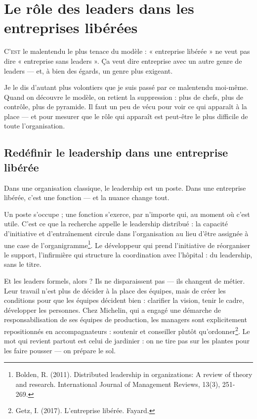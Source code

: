 
\chapter{Le rôle des leaders dans les entreprises libérées}

\lettrine[lines=2]{C}{'est} le malentendu le plus tenace du modèle : « entreprise libérée » ne veut pas dire « entreprise sans leaders ». Ça veut dire entreprise avec un autre genre de leaders — et, à bien des égards, un genre plus exigeant.

Je le dis d'autant plus volontiers que je suis passé par ce malentendu moi-même. Quand on découvre le modèle, on retient la suppression : plus de chefs, plus de contrôle, plus de pyramide. Il faut un peu de vécu pour voir ce qui apparaît à la place — et pour mesurer que le rôle qui apparaît est peut-être le plus difficile de toute l'organisation.

\section{Redéfinir le leadership dans une entreprise libérée}

Dans une organisation classique, le leadership est un poste. Dans une entreprise libérée, c'est une fonction — et la nuance change tout.

Un poste s'occupe ; une fonction s'exerce, par n'importe qui, au moment où c'est utile. C'est ce que la recherche appelle le leadership distribué : la capacité d'initiative et d'entraînement circule dans l'organisation au lieu d'être assignée à une case de l'organigramme\footnote{Bolden, R. (2011). Distributed leadership in organizations: A review of theory and research. International Journal of Management Reviews, 13(3), 251-269.}. Le développeur qui prend l'initiative de réorganiser le support, l'infirmière qui structure la coordination avec l'hôpital : du leadership, sans le titre.

Et les leaders formels, alors ? Ils ne disparaissent pas — ils changent de métier. Leur travail n'est plus de décider à la place des équipes, mais de créer les conditions pour que les équipes décident bien : clarifier la vision, tenir le cadre, développer les personnes. Chez Michelin, qui a engagé une démarche de responsabilisation de ses équipes de production, les managers sont explicitement repositionnés en accompagnateurs : soutenir et conseiller plutôt qu'ordonner\footnote{Getz, I. (2017). L'entreprise libérée. Fayard.}. Le mot qui revient partout est celui de jardinier : on ne tire pas sur les plantes pour les faire pousser — on prépare le sol.

